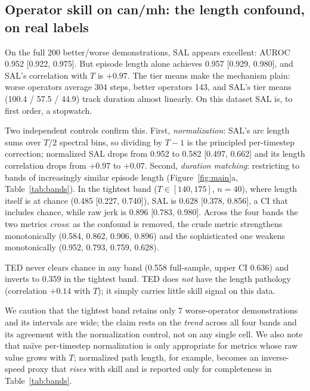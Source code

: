 \documentclass[10pt]{article}
\begin{document}
\subsection{Operator skill on can/mh: the length confound, on real labels}

On the full 200 better/worse demonstrations, SAL appears excellent: AUROC
0.952 [0.922, 0.975]. But episode length alone achieves 0.957 [0.929,
0.980], and SAL's correlation with $T$ is $+0.97$. The tier means make the
mechanism plain: worse operators average 304 steps, better operators 143,
and SAL's tier means (100.4 / 57.5 / 44.9) track duration almost linearly.
On this dataset SAL is, to first order, a stopwatch.

Two independent controls confirm this. First, \emph{normalization}: SAL's
arc length sums over $T/2$ spectral bins, so dividing by $T{-}1$ is the
principled per-timestep correction; normalized SAL drops from 0.952 to 0.582
[0.497, 0.662] and its length correlation drops from $+0.97$ to $+0.07$.
Second, \emph{duration matching}: restricting to bands of increasingly
similar episode length (Figure~\ref{fig:main}a, Table~\ref{tab:bands}). In
the tightest band ($T \in [140,175]$, $n{=}40$), where length itself is at
chance (0.485 [0.227, 0.740]), SAL is 0.628 [0.378, 0.856], a CI that
includes chance, while raw jerk is 0.896 [0.783, 0.980]. Across the four
bands the two metrics \emph{cross}: as the confound is removed, the crude
metric strengthens monotonically (0.584, 0.862, 0.906, 0.896) and the
sophisticated one weakens monotonically (0.952, 0.793, 0.759, 0.628).

TED never clears chance in any band (0.558 full-sample, upper CI 0.636)
and inverts to 0.359 in the tightest band. TED does \emph{not}
have the length pathology (correlation $+0.14$ with $T$); it simply carries
little skill signal on this data.

We caution that the tightest band retains only 7 worse-operator
demonstrations and its intervals are wide; the claim rests on the
\emph{trend} across all four bands and its agreement with the normalization
control, not on any single cell. We also note that na\"ive per-timestep
normalization is only appropriate for metrics whose raw value grows with
$T$; normalized path length, for example, becomes an inverse-speed proxy
that \emph{rises} with skill and is reported only for completeness in
Table~\ref{tab:bands}.
\end{document}
